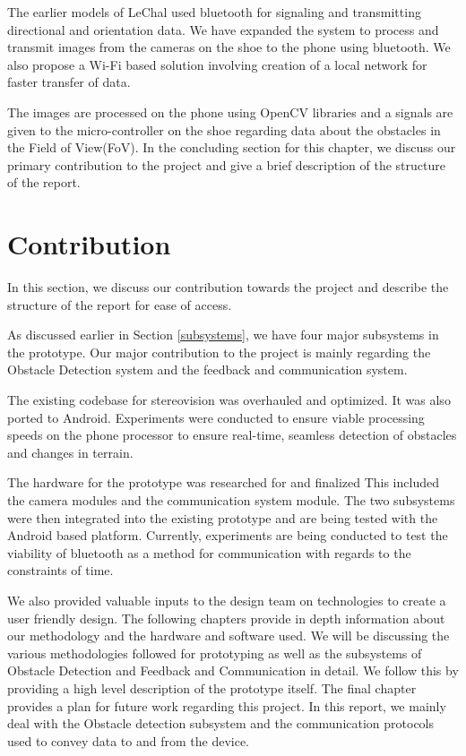 \documentclass[11pt]{report}
\begin{document}
The earlier models of LeChal used bluetooth for signaling and transmitting directional and orientation data\cite{compdata}. We have expanded the system to process and transmit images from the cameras on the shoe to the phone using bluetooth. We also propose a Wi-Fi based solution involving creation of a local network for faster transfer of data. 

The images are processed on the phone using OpenCV libraries and a signals are given to the micro-controller on the shoe regarding data about the obstacles in the Field of View(FoV).   
\newline
\newline
In the concluding section for this chapter, we discuss our primary contribution to the project and give a brief description of the structure of the report.

\section{Contribution}

In this section, we discuss our contribution towards the project and describe the structure of the report for ease of access.  

As discussed earlier in Section \ref{subsystems}, we have four major subsystems in the prototype. Our major contribution to the project is mainly regarding the Obstacle Detection system and the feedback and communication system. 

The existing codebase for stereovision was overhauled and optimized. It was also ported to Android. Experiments were conducted to ensure viable processing speeds on the phone processor to ensure real-time, seamless detection of obstacles and changes in terrain. 

The hardware for the prototype was researched for and finalized This included the camera modules and the communication system module. The two subsystems were then integrated into the existing prototype and are being tested with the Android based platform. Currently, experiments are being conducted to test the viability of bluetooth as a method for communication with regards to the constraints of time. 

We also provided valuable inputs to the design team on technologies to create a user friendly design. 
\newline
\newline
The following chapters provide in depth information about our methodology and the hardware and software used. We will be discussing the various methodologies followed for prototyping as well as the subsystems of Obstacle Detection and Feedback and Communication in detail. We follow this by providing a high level description of the prototype itself. The final chapter provides a plan for future work regarding this project. In this report, we mainly deal with the Obstacle detection subsystem and the communication protocols used to convey data to and from the device.
\end{document}
